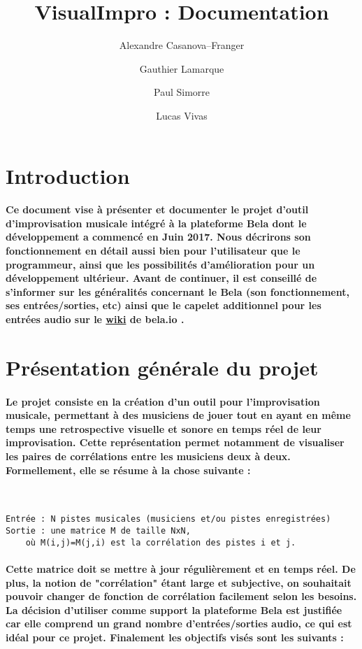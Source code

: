 \documentclass[a4paper]{article}
\title{VisualImpro : Documentation}
\author{Alexandre Casanova--Franger\and
Gauthier Lamarque\and Paul Simorre\and Lucas Vivas}
\begin{document}
\maketitle

\tableofcontents

\section{Introduction} \paragraph{Ce document vise à présenter et documenter le
projet d’outil d’improvisation musicale intégré à la plateforme Bela dont le
développement a commencé en Juin 2017. Nous décrirons son fonctionnement en
détail aussi bien pour l’utilisateur que le programmeur, ainsi que les
possibilités d’amélioration pour un développement ultérieur. Avant de continuer,
il est conseillé de s’informer sur les généralités concernant le Bela (son
fonctionnement, ses entrées/sorties, etc) ainsi que le capelet additionnel pour
les entrées audio sur le \href{https://github.com/BelaPlatform/Bela/wiki}{wiki}
de bela.io .}

\section{Présentation générale du projet} \paragraph{Le projet consiste en la
création d’un outil pour l’improvisation musicale, permettant à des musiciens de
jouer tout en ayant en même temps une retrospective visuelle et sonore en temps
réel de leur improvisation. Cette représentation permet notamment de visualiser
les paires de corrélations entre les musiciens deux à deux. Formellement, elle
se résume à la chose suivante :} \

\begin{Verbatim}
Entrée : N pistes musicales (musiciens et/ou pistes enregistrées)
Sortie : une matrice M de taille NxN,
	où M(i,j)=M(j,i) est la corrélation des pistes i et j.
\end{Verbatim}

\paragraph{Cette matrice doit se mettre à jour régulièrement et en temps réel.
De plus, la notion de "corrélation" étant large et subjective, on souhaitait
pouvoir changer de fonction de corrélation facilement selon les besoins. La
décision d’utiliser comme support la plateforme Bela est justifiée car elle
comprend un grand nombre d’entrées/sorties audio, ce qui est idéal pour ce
projet. Finalement les objectifs visés sont les suivants :}
\end{document}
